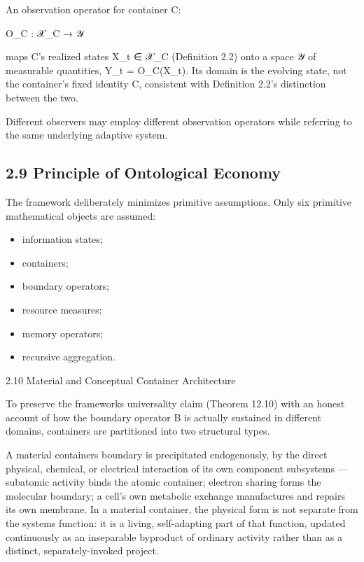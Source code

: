 \documentclass[
]{article}
\begin{document}
An observation operator for container C:

O\_C : 𝒳\_C → 𝒴

maps C's realized states X\_t ∈ 𝒳\_C (Definition 2.2) onto a space 𝒴 of
measurable quantities, Y\_t = O\_C(X\_t). Its domain is the evolving
state, not the container's fixed identity C, consistent with Definition
2.2's distinction between the two.

Different observers may employ different observation operators while
referring to the same underlying adaptive system.

\hypertarget{principle-of-ontological-economy}{%
\subsection{2.9 Principle of Ontological
Economy}\label{principle-of-ontological-economy}}

The framework deliberately minimizes primitive assumptions. Only six
primitive mathematical objects are assumed:

\begin{itemize}
\item
  information states;
\item
  containers;
\item
  boundary operators;
\item
  resource measures;
\item
  memory operators;
\item
  recursive aggregation.
\end{itemize}

2.10 Material and Conceptual Container Architecture

To preserve the frameworks universality claim (Theorem 12.10) with an
honest account of how the boundary operator B is actually sustained in
different domains, containers are partitioned into two structural types.

A material containers boundary is precipitated endogenously, by the
direct physical, chemical, or electrical interaction of its own
component subsystems --- subatomic activity binds the atomic container;
electron sharing forms the molecular boundary; a cell's own metabolic
exchange manufactures and repairs its own membrane. In a material
container, the physical form is not separate from the systems function:
it is a living, self-adapting part of that function, updated
continuously as an inseparable byproduct of ordinary activity rather
than as a distinct, separately-invoked project.
\end{document}
